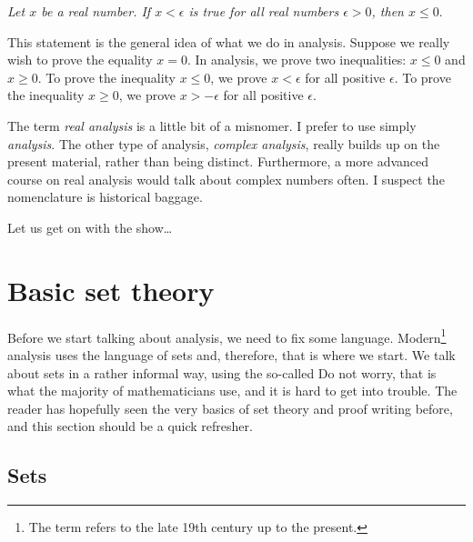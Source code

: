 \emph{Let $x$ be a real number.  If $x < \epsilon$ is true for all
real numbers
$\epsilon > 0$, then $x \leq 0$}.

\medskip

This statement is the general idea of what we do in analysis.
Suppose we really wish to prove the equality
$x = 0$.  In analysis, we prove two inequalities:
$x \leq 0$ and $x \geq 0$.
To
prove the inequality
$x \leq 0$, we prove 
$x < \epsilon$ for all positive $\epsilon$.
To
prove the inequality
$x \geq 0$, we prove 
$x > -\epsilon$ for all positive $\epsilon$.

\medskip

The term \emph{real analysis} is a little bit of a misnomer.  I prefer to
use simply \emph{analysis}.  The other type of analysis, 
\emph{complex analysis}, really builds up on the present material, rather than
being distinct.  Furthermore, a more advanced course on real
analysis would talk about complex numbers often.
I suspect the nomenclature is
historical baggage.

\medskip

Let us get on with the show\ldots



\sectionnewpage
\section{Basic set theory} \label{sec:basicset}



Before we start talking about analysis, we need to fix some language.
Modern\footnote{The term  refers to the late 19th century up to
the present.}
analysis uses the language of sets and, therefore, that is where we start.
We talk about sets in a rather informal way, using the so-called
  Do not worry, that is what the majority of
mathematicians use, and it is hard to get into trouble.
The reader has hopefully seen the very basics of set theory
and proof writing before, and this section should be a quick refresher.

\subsection{Sets}

